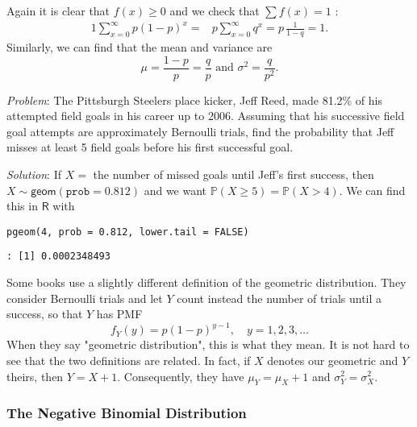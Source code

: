 Again it is clear that \(f(x)\geq0\) and we check that \(\sum f(x)=1\)
:
\begin{alignat*}{1}
\sum_{x=0}^{\infty}p(1-p)^{x}= & p\sum_{x=0}^{\infty}q^{x}=p\,\frac{1}{1-q}=1.
\end{alignat*}
Similarly, we can find that the mean and variance are
\begin{equation}
\mu=\frac{1-p}{p}=\frac{q}{p}\mbox{ and }\sigma^{2}=\frac{q}{p^{2}}.
\end{equation}


\emph{Problem}:
The Pittsburgh Steelers place kicker, Jeff Reed, made 81.2\% of his
attempted field goals in his career up to 2006. Assuming that his
successive field goal attempts are approximately Bernoulli trials,
find the probability that Jeff misses at least 5 field goals before
his first successful goal.

\emph{Solution}: If \(X=\) the number of missed goals until Jeff's first
success, then \(X\sim\mathsf{geom}(\mathtt{prob}=0.812)\) and we want
\(\mathbb{P}(X\geq5)=\mathbb{P}(X>4)\). We can find this in
\(\mathsf{R}\) with

\begin{Verbatim}
pgeom(4, prob = 0.812, lower.tail = FALSE)
\end{Verbatim}

\begin{verbatim}
: [1] 0.0002348493
\end{verbatim}



\begin{note}
Some books use a slightly different definition of the geometric
distribution. They consider Bernoulli trials and let \(Y\) count
instead the number of trials until a success, so that \(Y\) has PMF
\begin{equation}
f_{Y}(y)=p(1-p)^{y-1},\quad y=1,2,3,\ldots
\end{equation}
When they say "geometric distribution", this is what they mean. It
is not hard to see that the two definitions are related. In fact, if
\(X\) denotes our geometric and \(Y\) theirs, then
\(Y=X+1\). Consequently, they have \(\mu_{Y}=\mu_{X}+1\) and
\(\sigma_{Y}^{2}=\sigma_{X}^{2}\).
\end{note}

\subsubsection{The Negative Binomial Distribution}
\label{sec-5-6-2-2}

